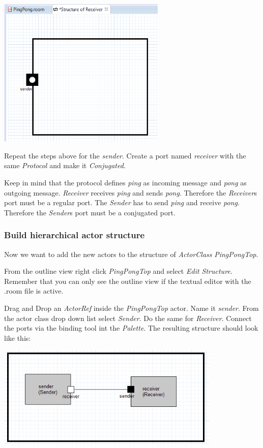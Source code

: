 \includegraphics[width=0.6\textwidth]{images/017-04-Port-for-Actor-Receiver.png}

Repeat the steps above for the \textit{sender}. Create a port named \emph{receiver} with the same \emph{Protocol} and make it \emph{Conjugated}.

Keep in mind that the protocol defines \textit{ping} as incoming message and \textit{pong} as outgoing message. 
\textit{Receiver} receives \emph{ping} and sends \emph{pong}. Therefore the \textit{Receiver}s port must be a 
regular port. The \textit{Sender} has to send \textit{ping} and receive \textit{pong}. Therefore the \textit{Sender}s port must be a conjugated port.

\subsubsection*{Build hierarchical actor structure}

Now we want to add the new actors to the structure of \emph{ActorClass} \emph{PingPongTop}.

From the outline view right click \textit{PingPongTop} and select \textit{Edit Structure}. Remember that you can only see the outline view if the textual editor with the .room file is active.

Drag and Drop an \textit{ActorRef} inside the \textit{PingPongTop} actor. Name it \textit{sender}. From the actor class drop down list select \textit{Sender}. Do the same for \textit{Receiver}. Connect the ports 
via the binding tool int the \emph{Palette}. The resulting structure should look like this:

\includegraphics[width=0.8\textwidth]{images/017-03-PingPongTop-Structure.png}

